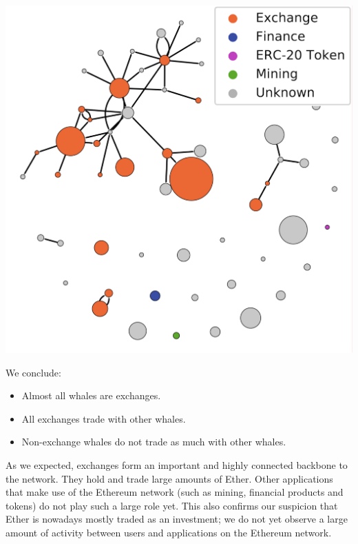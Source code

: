 \documentclass[10pt,a4paper]{article}
\newenvironment{Figure}
  {\par\medskip\noindent\minipage{\linewidth}}
  {\endminipage\par\medskip}
\begin{document}
\begin{multicols}{2}
\vspace{5pt}
\begin{Figure}
\centering
\includegraphics[scale=0.23]{figures/whales.pdf}
\label{whales}
\end{Figure}

We conclude:
\begin{itemize}
\item{Almost all whales are exchanges.}
\item{All exchanges trade with other whales.}
\item{Non-exchange whales do not trade as much with other whales.}
\end{itemize}

As we expected, exchanges form an important and highly connected backbone to the network. They hold and trade large amounts of Ether. Other applications that make use of the Ethereum network (such as mining, financial products and tokens) do not play such a large role yet. This also confirms our suspicion that Ether is nowadays mostly traded as an investment; we do not yet observe a large amount of activity between users and applications on the Ethereum network.


\end{multicols}
\end{document}
